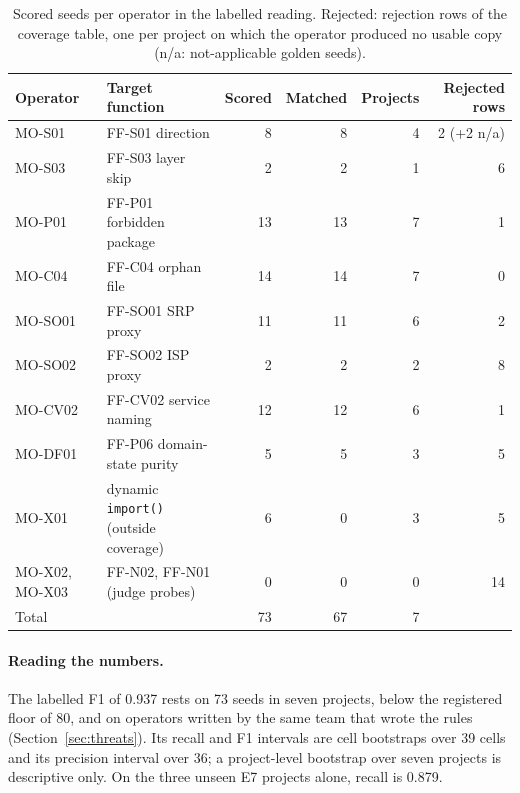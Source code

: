 \documentclass[10pt,a4paper]{article}
\begin{document}
\begin{table}[t]
\centering
\caption{Scored seeds per operator in the labelled reading. Rejected: rejection rows of the coverage table, one per project on which the operator produced no usable copy (n/a: not-applicable golden seeds).}
\label{tab:ops}
\small
\begin{tabular}{@{}llrrrr@{}}
\toprule
Operator & Target function & Scored & Matched & Projects & Rejected rows \\
\midrule
MO-S01 & FF-S01 direction & 8 & 8 & 4 & 2 (+2 n/a) \\
MO-S03 & FF-S03 layer skip & 2 & 2 & 1 & 6 \\
MO-P01 & FF-P01 forbidden package & 13 & 13 & 7 & 1 \\
MO-C04 & FF-C04 orphan file & 14 & 14 & 7 & 0 \\
MO-SO01 & FF-SO01 SRP proxy & 11 & 11 & 6 & 2 \\
MO-SO02 & FF-SO02 ISP proxy & 2 & 2 & 2 & 8 \\
MO-CV02 & FF-CV02 service naming & 12 & 12 & 6 & 1 \\
MO-DF01 & FF-P06 domain-state purity & 5 & 5 & 3 & 5 \\
MO-X01 & dynamic \texttt{import()} (outside coverage) & 6 & 0 & 3 & 5 \\
MO-X02, MO-X03 & FF-N02, FF-N01 (judge probes) & 0 & 0 & 0 & 14 \\
\midrule
Total & & 73 & 67 & 7 & \\
\bottomrule
\end{tabular}
\end{table}

\paragraph{Reading the numbers.}
The labelled F1 of 0.937 rests on 73 seeds in seven projects, below the registered floor of 80, and on operators
written by the same team that wrote the rules (Section~\ref{sec:threats}). Its recall and F1 intervals are cell
bootstraps over 39 cells and its precision interval over 36; a project-level bootstrap over seven projects is
descriptive only. On the three unseen E7 projects alone, recall is 0.879. %
\end{document}
